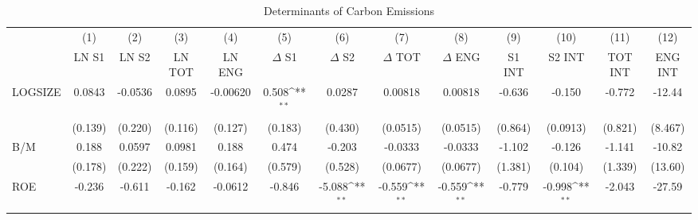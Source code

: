 \begin{table}[htbp]\centering
\def\sym#1{\ifmmode^{#1}\else\(^{#1}\)\fi}
\caption{Determinants of Carbon Emissions}
\begin{tabular}{l*{12}{c}}
\hline\hline
                    &\multicolumn{1}{c}{(1)}&\multicolumn{1}{c}{(2)}&\multicolumn{1}{c}{(3)}&\multicolumn{1}{c}{(4)}&\multicolumn{1}{c}{(5)}&\multicolumn{1}{c}{(6)}&\multicolumn{1}{c}{(7)}&\multicolumn{1}{c}{(8)}&\multicolumn{1}{c}{(9)}&\multicolumn{1}{c}{(10)}&\multicolumn{1}{c}{(11)}&\multicolumn{1}{c}{(12)}\\
                    &\multicolumn{1}{c}{LN S1}&\multicolumn{1}{c}{LN S2}&\multicolumn{1}{c}{LN TOT}&\multicolumn{1}{c}{LN ENG}&\multicolumn{1}{c}{$\Delta$ S1}&\multicolumn{1}{c}{$\Delta$ S2}&\multicolumn{1}{c}{$\Delta$ TOT}&\multicolumn{1}{c}{$\Delta$ ENG}&\multicolumn{1}{c}{S1 INT}&\multicolumn{1}{c}{S2 INT}&\multicolumn{1}{c}{TOT INT}&\multicolumn{1}{c}{ENG INT}\\
\hline
LOGSIZE             &      0.0843         &     -0.0536         &      0.0895         &    -0.00620         &       0.508\sym{**} &      0.0287         &     0.00818         &     0.00818         &      -0.636         &      -0.150         &      -0.772         &      -12.44         \\
                    &     (0.139)         &     (0.220)         &     (0.116)         &     (0.127)         &     (0.183)         &     (0.430)         &    (0.0515)         &    (0.0515)         &     (0.864)         &    (0.0913)         &     (0.821)         &     (8.467)         \\
B/M                 &       0.188         &      0.0597         &      0.0981         &       0.188         &       0.474         &      -0.203         &     -0.0333         &     -0.0333         &      -1.102         &      -0.126         &      -1.141         &      -10.82         \\
                    &     (0.178)         &     (0.222)         &     (0.159)         &     (0.164)         &     (0.579)         &     (0.528)         &    (0.0677)         &    (0.0677)         &     (1.381)         &     (0.104)         &     (1.339)         &     (13.60)         \\
ROE                 &      -0.236         &      -0.611         &      -0.162         &     -0.0612         &      -0.846         &      -5.088\sym{**} &      -0.559\sym{**} &      -0.559\sym{**} &      -0.779         &      -0.998\sym{**} &      -2.043         &      -27.59         \\

\end{tabular}
\end{table}
